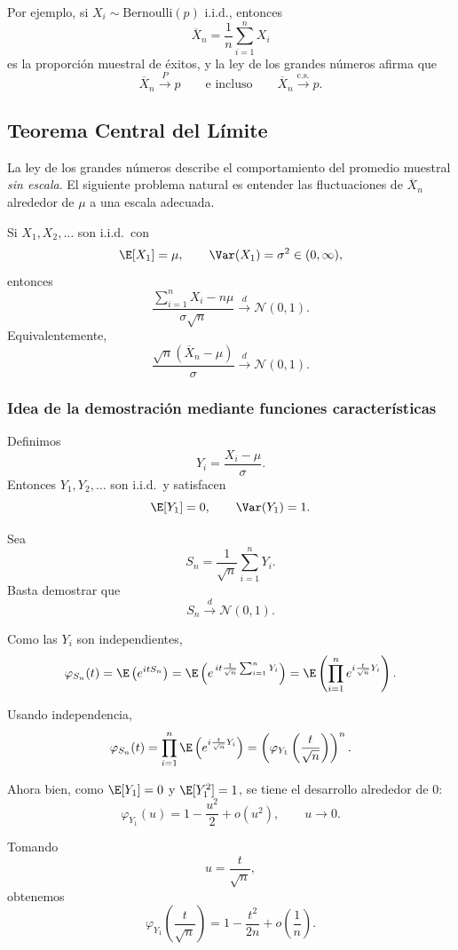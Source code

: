 Por ejemplo, si $X_i\sim \mathrm{Bernoulli}(p)$ i.i.d., entonces
\[
\overline{X}_n=\frac{1}{n}\sum_{i=1}^n X_i
\]
es la proporción muestral de éxitos, y la ley de los grandes números afirma que
\[
\overline{X}_n \xrightarrow{P} p
\qquad
\text{e incluso}
\qquad
\overline{X}_n \xrightarrow{\mathrm{c.s.}} p.
\]

\subsection{Teorema Central del Límite}

La ley de los grandes números describe el comportamiento del promedio muestral \emph{sin escala}. El siguiente problema natural es entender las fluctuaciones de $\overline{X}_n$ alrededor de $\mu$ a una escala adecuada.

\begin{teo}
Si $X_1,X_2,\dots$ son i.i.d.\ con
\[
\E[X_1]=\mu,
\qquad
\Var(X_1)=\sigma^2\in(0,\infty),
\]
entonces
\[
\frac{\sum_{i=1}^n X_i - n\mu}{\sigma\sqrt{n}}
\xrightarrow{d}
\mathcal{N}(0,1).
\]
Equivalentemente,
\[
\frac{\sqrt{n}(\overline{X}_n-\mu)}{\sigma}
\xrightarrow{d}
\mathcal{N}(0,1).
\]
\end{teo}

\subsubsection*{Idea de la demostración mediante funciones características}

Definimos
\[
Y_i=\frac{X_i-\mu}{\sigma}.
\]
Entonces $Y_1,Y_2,\dots$ son i.i.d.\ y satisfacen
\[
\E[Y_1]=0,
\qquad
\Var(Y_1)=1.
\]

Sea
\[
S_n=\frac{1}{\sqrt{n}}\sum_{i=1}^n Y_i.
\]
Basta demostrar que
\[
S_n\xrightarrow{d}\mathcal{N}(0,1).
\]

Como las $Y_i$ son independientes,
\[
\varphi_{S_n}(t)
=
\E\left(e^{itS_n}\right)
=
\E\left(
e^{\,it\frac{1}{\sqrt{n}}\sum_{i=1}^n Y_i}
\right)
=
\E\left(
\prod_{i=1}^n e^{i\frac{t}{\sqrt{n}}Y_i}
\right).
\]

Usando independencia,
\[
\varphi_{S_n}(t)
=
\prod_{i=1}^n \E\left(e^{i\frac{t}{\sqrt{n}}Y_i}\right)
=
\left(\varphi_{Y_1}\left(\frac{t}{\sqrt{n}}\right)\right)^n.
\]

Ahora bien, como $\E[Y_1]=0$ y $\E[Y_1^2]=1$, se tiene el desarrollo alrededor de $0$:
\[
\varphi_{Y_1}(u)=1-\frac{u^2}{2}+o(u^2),
\qquad u\to 0.
\]

Tomando
\[
u=\frac{t}{\sqrt{n}},
\]
obtenemos
\[
\varphi_{Y_1}\left(\frac{t}{\sqrt{n}}\right)
=
1-\frac{t^2}{2n}+o\left(\frac{1}{n}\right).
\]

